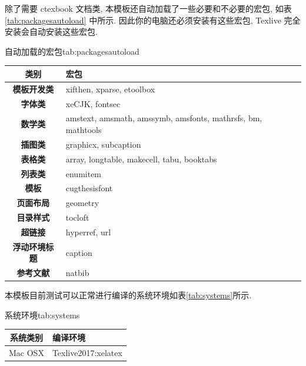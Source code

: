 \documentclass[bibsec, doctor]{cugthesis}
\begin{document}
除了需要 ctexbook 文档类, 本模板还自动加载了一些必要和不必要的宏包, 如表\ref{tab:packagesautoload}
中所示. 因此你的电脑还必须安装有这些宏包, Texlive 完全安装会自动安装这些宏包.
\begin{ttab}{\cugthesis{} 自动加载的宏包}{tab:packagesautoload}
    \begin{tabular}{>{\bfseries}cl}
        \toprule 
        类别         & 宏包                                                         \\
        \midrule
        模板开发类   & xifthen, xparse, etoolbox                                    \\
        字体类       & xeCJK, fontsec                                               \\
        数学类       & amstext, amsmath, amssymb, amsfonts, mathrsfs, bm, mathtools \\
        插图类       & graphicx, subcaption                                         \\
        表格类       & array, longtable, makecell, tabu, booktabs                   \\
        列表类       & enumitem                                                     \\
        模板         & cugthesisfont                                                \\
        页面布局     & geometry                                                     \\
        目录样式     & tocloft                                                      \\
        超链接       & hyperref, url                                                \\
        浮动环境标题 & caption                                                      \\
        参考文献     & natbib                                                       \\
        \bottomrule
    \end{tabular}
\end{ttab}

本模板目前测试可以正常进行编译的系统环境如表\ref{tab:systems}所示.
\begin{ttab}{系统环境}{tab:systems}
    \begin{tabular}{cl}
        \toprule
        系统类别 & 编译环境            \\
        \midrule 
        Mac OSX  & Texlive2017:xelatex \\
        \bottomrule  
    \end{tabular}
\end{ttab}
\end{document}
